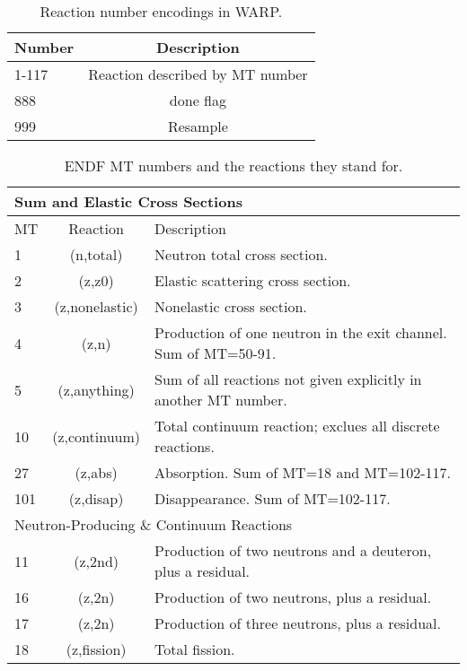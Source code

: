 \chapter{}


\begin{table}[h]
\centering
\caption{Reaction number encodings in WARP.}
\label{WARP_numbers}
\begin{tabular}{| l c |}
\hline
Number &  Description \\
\hline
1-117	  &   Reaction described by MT number  \\
888 	& done flag \\
999	&   Resample	\\
\hline
\end{tabular}
\end{table}


\begin{table}[h]
\centering
\caption{ENDF MT numbers and the reactions they stand for.}
\label{MT_numbers}\scriptsize
\begin{tabular}{| l | c | l |}
\multicolumn{3}{l}{Sum and Elastic Cross Sections}\\
\hline
MT & Reaction & Description \\
\hline
1	  & (n,total)	    &  Neutron total cross section. \\
2	  & (z,z0)	      & Elastic scattering cross section.\\
3	  & (z,nonelastic)&	Nonelastic cross section. \\
4	  & (z,n)	        &  Production of one neutron in the exit channel. Sum of MT=50-91.	\\
5	  & (z,anything)	& Sum of all reactions not given explicitly in another MT number. \\
10	& (z,continuum)	& Total continuum reaction; exclues all discrete reactions.	\\
27	& (z,abs)	    &    Absorption. Sum of MT=18 and MT=102-117.	\\
101	& (z,disap)	  &   Disappearance. Sum of MT=102-117.	\\
\hline
\multicolumn{3}{l}{Neutron-Producing \& Continuum Reactions}\\
\hline
11	& (z,2nd)	    &  Production of two neutrons and a deuteron, plus a residual.	\\
16	& (z,2n)	    &   Production of two neutrons, plus a residual.	\\
17	& (z,2n)	    &   Production of three neutrons, plus a residual.	\\
18	& (z,fission)  &	   Total fission.\\

\end{tabular}
\end{table}
